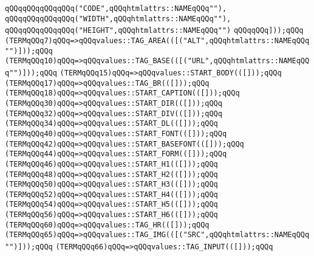\verb|qQQqqQQqqQQqqQQq("CODE",qQQqhtmlattrs::NAMEqQQq""),|\newline
\verb|qQQqqQQqqQQqqQQq("WIDTH",qQQqhtmlattrs::NAMEqQQq""),|\newline
\verb|qQQqqQQqqQQqqQQq("HEIGHT",qQQqhtmlattrs::NAMEqQQq"")|\newline
\verb|qQQqqQQq]));qQQq|\newline
\verb|(TERMqQQq7)qQQq=>qQQqvalues::TAG_AREA(([("ALT",qQQqhtmlattrs::NAMEqQQq"")]));qQQq|\newline
\verb|(TERMqQQq10)qQQq=>qQQqvalues::TAG_BASE(([("URL",qQQqhtmlattrs::NAMEqQQq"")]));qQQq|\newline
\verb|(TERMqQQq15)qQQq=>qQQqvalues::START_BODY(([]));qQQq|\newline
\verb|(TERMqQQq17)qQQq=>qQQqvalues::TAG_BR(([]));qQQq|\newline
\verb|(TERMqQQq18)qQQq=>qQQqvalues::START_CAPTION(([]));qQQq|\newline
\verb|(TERMqQQq30)qQQq=>qQQqvalues::START_DIR(([]));qQQq|\newline
\verb|(TERMqQQq32)qQQq=>qQQqvalues::START_DIV(([]));qQQq|\newline
\verb|(TERMqQQq34)qQQq=>qQQqvalues::START_DL(([]));qQQq|\newline
\verb|(TERMqQQq40)qQQq=>qQQqvalues::START_FONT(([]));qQQq|\newline
\verb|(TERMqQQq42)qQQq=>qQQqvalues::START_BASEFONT(([]));qQQq|\newline
\verb|(TERMqQQq44)qQQq=>qQQqvalues::START_FORM(([]));qQQq|\newline
\verb|(TERMqQQq46)qQQq=>qQQqvalues::START_H1(([]));qQQq|\newline
\verb|(TERMqQQq48)qQQq=>qQQqvalues::START_H2(([]));qQQq|\newline
\verb|(TERMqQQq50)qQQq=>qQQqvalues::START_H3(([]));qQQq|\newline
\verb|(TERMqQQq52)qQQq=>qQQqvalues::START_H4(([]));qQQq|\newline
\verb|(TERMqQQq54)qQQq=>qQQqvalues::START_H5(([]));qQQq|\newline
\verb|(TERMqQQq56)qQQq=>qQQqvalues::START_H6(([]));qQQq|\newline
\verb|(TERMqQQq60)qQQq=>qQQqvalues::TAG_HR(([]));qQQq|\newline
\verb|(TERMqQQq65)qQQq=>qQQqvalues::TAG_IMG(([("SRC",qQQqhtmlattrs::NAMEqQQq"")]));qQQq|\newline
\verb|(TERMqQQq66)qQQq=>qQQqvalues::TAG_INPUT(([]));qQQq|\newline
